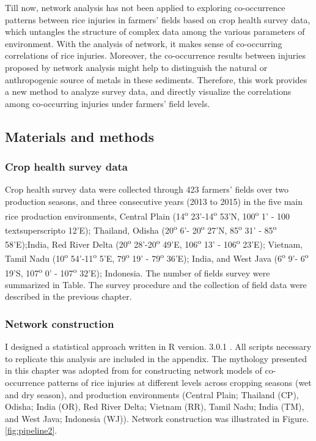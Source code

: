 Till now, network analysis has not been applied to exploring co-occurrence patterns between rice injuries in farmers’ fields based on crop health survey data, which untangles the structure of complex data among the various parameters of environment. With the analysis of network, it makes sense of co-occurring correlations of rice injuries. Moreover, the co-occurrence results between injuries proposed by network analysis might help to distinguish the natural or anthropogenic source of metals in these sediments. Therefore, this work provides a new method to analyze survey data, and directly visualize the correlations among co-occurring injuries under farmers’ field levels.

\subsection{Materials and methods} 

\subsubsection{Crop health survey data}
Crop health survey data were collected through 423 farmers’ fields over two production seasons, and three consecutive years (2013 to 2015) in the five main rice production environments, Central Plain (14\textsuperscript{o} 23’-14\textsuperscript{o} 53’N, 100\textsuperscript{o} 1’ - 100 textsuperscript{o} 12’E); Thailand, Odisha (20\textsuperscript{o} 6’- 20\textsuperscript{o} 27’N, 85\textsuperscript{o} 31’ - 85\textsuperscript{o} 58’E);India, Red River Delta (20\textsuperscript{o} 28’-20\textsuperscript{o} 49’E, 106\textsuperscript{o} 13’ - 106\textsuperscript{o}  23’E); Vietnam, Tamil Nadu (10\textsuperscript{o} 54’-11\textsuperscript{o} 5’E, 79\textsuperscript{o} 19’ - 79\textsuperscript{o}  36’E); India, and West Java (6\textsuperscript{o} 9’- 6\textsuperscript{o} 19’S, 107\textsuperscript{o} 0’ - 107\textsuperscript{o}  32’E); Indonesia. The number of fields survey were summarized in Table. The survey procedure and the collection of field data were described in  the previous chapter.


\subsubsection{Network construction}
I designed a statistical approach written in R version. 3.0.1 \citep{R_2015}. All scripts necessary to replicate this analysis are included in the appendix. The mythology presented in this chapter was adopted from \citet{Williams_2014_demonstrating} for constructing network models of co-occurrence patterns of rice injuries at different levels across cropping seasons (wet and dry season), and production environments (Central Plain; Thailand (CP), Odisha; India (OR), Red River Delta; Vietnam (RR), Tamil Nadu; India (TM), and West Java; Indonesia (WJ)). Network construction was illustrated in Figure.\ref{fig:pipeline2}.

